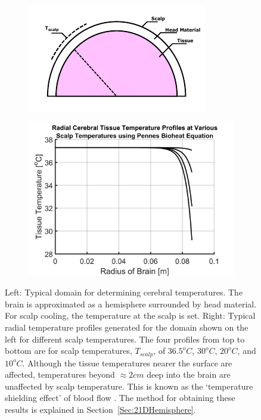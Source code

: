 \documentclass[11pt,english,a4paper,twoside,openright]{report}
\begin{document}
{{{{{{{{	\begin{figure}[h]
		\centering
		\begin{subfigure}{0.49\textwidth}
			\includegraphics[width=\textwidth]{1DHemisphere/hemisphere3}
		\end{subfigure}
		\begin{subfigure}{0.49\textwidth}
			\includegraphics[width=\textwidth]{Chapter1_PennesProfiles}
		\end{subfigure}
		\caption[Typical domain and temperature profiles for cerebral bioheat models found in literature using Pennes Bioheat Equation]{Left: Typical domain for determining cerebral temperatures. The brain is approximated as a hemisphere surrounded by head material. For scalp cooling, the temperature at the scalp is set. Right: Typical radial temperature profiles generated for the domain shown on the left for different scalp temperatures. The four profiles from top to bottom are for scalp temperatures, $T_{scalp}$, of $36.5^{o}C$, $30^{o}C$, $20^{o}C$, and $10^{o}C$. Although the tissue temperatures nearer the surface are affected, temperatures beyond ${\approx}2cm$ deep into the brain are unaffected by scalp temperature. This is known as the `temperature shielding effect' of  blood flow \cite{zhu2006body}. The method for obtaining these results is explained in Section~\ref{Sec:21DHemisphere}.}
		\label{fig:PennesTemperatureExample}
	\end{figure}
	
}}}}}}}}
\end{document}
